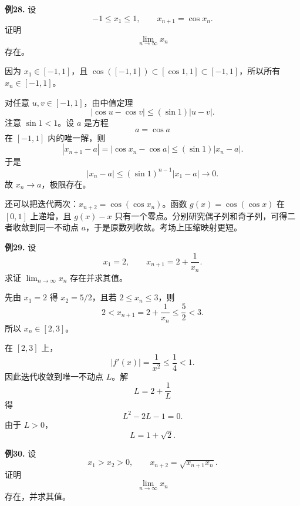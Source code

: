 \begin{problemblock}
\textbf{例28.} 设
\[
-1\le x_1\le1,\qquad x_{n+1}=\cos x_n.
\]
证明
\[
\lim_{n\to\infty}x_n
\]
存在。
\end{problemblock}

\begin{solutionblock}

因为 \(x_1\in[-1,1]\)，且 \(\cos([-1,1])\subset[\cos1,1]\subset[-1,1]\)，所以所有 \(x_n\in[-1,1]\)。

对任意 \(u,v\in[-1,1]\)，由中值定理
\[
|\cos u-\cos v|\le(\sin1)|u-v|.
\]
注意 \(\sin1<1\)。设 \(a\) 是方程
\[
a=\cos a
\]
在 \([-1,1]\) 内的唯一解，则
\[
|x_{n+1}-a|
=|\cos x_n-\cos a|
\le(\sin1)|x_n-a|.
\]
于是
\[
|x_n-a|\le(\sin1)^{n-1}|x_1-a|\to0.
\]
故 \(x_n\to a\)，极限存在。

还可以把迭代两次：\(x_{n+2}=\cos(\cos x_n)\)。函数 \(g(x)=\cos(\cos x)\) 在 \([0,1]\) 上递增，且 \(g(x)-x\) 只有一个零点。分别研究偶子列和奇子列，可得二者收敛到同一不动点 \(a\)，于是原数列收敛。考场上压缩映射更短。
\end{solutionblock}

\begin{problemblock}
\textbf{例29.} 设
\[
x_1=2,\qquad x_{n+1}=2+\frac1{x_n}.
\]
求证 \(\displaystyle\lim_{n\to\infty}x_n\) 存在并求其值。
\end{problemblock}

\begin{solutionblock}

先由 \(x_1=2\) 得 \(x_2=5/2\)，且若 \(2\le x_n\le3\)，则
\[
2<x_{n+1}=2+\frac1{x_n}\le \frac52<3.
\]
所以 \(x_n\in[2,3]\)。

在 \([2,3]\) 上，
\[
|f'(x)|=\frac1{x^2}\le\frac14<1.
\]
因此迭代收敛到唯一不动点 \(L\)。解
\[
L=2+\frac1L
\]
得
\[
L^2-2L-1=0.
\]
由于 \(L>0\)，
\[
L=1+\sqrt2.
\]

\end{solutionblock}

\begin{problemblock}
\textbf{例30.} 设
\[
x_1>x_2>0,\qquad x_{n+2}=\sqrt{x_{n+1}x_n}.
\]
证明
\[
\lim_{n\to\infty}x_n
\]
存在，并求其值。
\end{problemblock}

